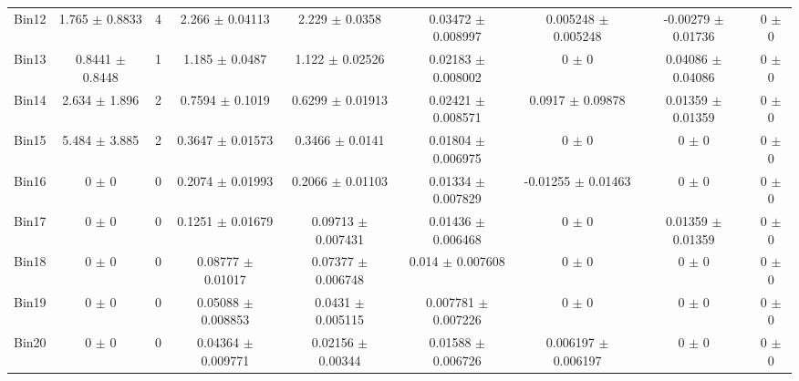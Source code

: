 \begin{tabular}{@{\extracolsep{4pt}}lcccccccc@{}}
     Bin12 & 1.765 $\pm$ 0.8833 & 4 & 2.266 $\pm$ 0.04113 & 2.229 $\pm$ 0.0358 & 0.03472 $\pm$ 0.008997 & 0.005248 $\pm$ 0.005248 & -0.00279 $\pm$ 0.01736 & 0 $\pm$ 0 \\ 
     Bin13 & 0.8441 $\pm$ 0.8448 & 1 & 1.185 $\pm$ 0.0487 & 1.122 $\pm$ 0.02526 & 0.02183 $\pm$ 0.008002 & 0 $\pm$ 0 & 0.04086 $\pm$ 0.04086 & 0 $\pm$ 0 \\ 
     Bin14 & 2.634 $\pm$ 1.896 & 2 & 0.7594 $\pm$ 0.1019 & 0.6299 $\pm$ 0.01913 & 0.02421 $\pm$ 0.008571 & 0.0917 $\pm$ 0.09878 & 0.01359 $\pm$ 0.01359 & 0 $\pm$ 0 \\ 
     Bin15 & 5.484 $\pm$ 3.885 & 2 & 0.3647 $\pm$ 0.01573 & 0.3466 $\pm$ 0.0141 & 0.01804 $\pm$ 0.006975 & 0 $\pm$ 0 & 0 $\pm$ 0 & 0 $\pm$ 0 \\ 
     Bin16 & 0 $\pm$ 0 & 0 & 0.2074 $\pm$ 0.01993 & 0.2066 $\pm$ 0.01103 & 0.01334 $\pm$ 0.007829 & -0.01255 $\pm$ 0.01463 & 0 $\pm$ 0 & 0 $\pm$ 0 \\ 
     Bin17 & 0 $\pm$ 0 & 0 & 0.1251 $\pm$ 0.01679 & 0.09713 $\pm$ 0.007431 & 0.01436 $\pm$ 0.006468 & 0 $\pm$ 0 & 0.01359 $\pm$ 0.01359 & 0 $\pm$ 0 \\ 
     Bin18 & 0 $\pm$ 0 & 0 & 0.08777 $\pm$ 0.01017 & 0.07377 $\pm$ 0.006748 & 0.014 $\pm$ 0.007608 & 0 $\pm$ 0 & 0 $\pm$ 0 & 0 $\pm$ 0 \\ 
     Bin19 & 0 $\pm$ 0 & 0 & 0.05088 $\pm$ 0.008853 & 0.0431 $\pm$ 0.005115 & 0.007781 $\pm$ 0.007226 & 0 $\pm$ 0 & 0 $\pm$ 0 & 0 $\pm$ 0 \\ 
     Bin20 & 0 $\pm$ 0 & 0 & 0.04364 $\pm$ 0.009771 & 0.02156 $\pm$ 0.00344 & 0.01588 $\pm$ 0.006726 & 0.006197 $\pm$ 0.006197 & 0 $\pm$ 0 & 0 $\pm$ 0 \\ 
\hline\hline
  \end{tabular}
